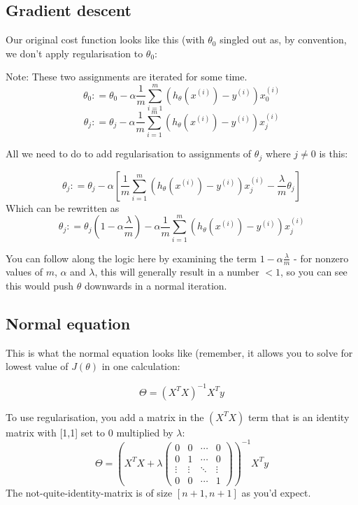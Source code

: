 \subsection{Gradient descent}

Our original cost function looks like this (with $\theta_0$ singled out as, by convention, we don't apply regularisation to $\theta_0$:

Note: These two assignments are iterated for some time.
\[
\theta_0 \mathrel{\mathop:}=
\theta_0 - \alpha \frac{1}{m}
\sum_{i=1}^{m}
(h_\theta(x^{(i)}) - y^{(i)})x_0^{(i)}
\]
\[
\theta_j \mathrel{\mathop:}=
\theta_j - \alpha \frac{1}{m}
\sum_{i=1}^{m}
(h_\theta(x^{(i)}) - y^{(i)})x_j^{(i)}
\]

All we need to do to add regularisation to assignments of $\theta_j$ where $j \neq 0$ is this:

\[
\theta_j \mathrel{\mathop:}=
\theta_j - \alpha [\frac{1}{m}
\sum_{i=1}^{m}
(h_\theta(x^{(i)}) - y^{(i)})x_j^{(i)} - \frac{\lambda}{m}\theta_j]
\]
Which can be rewritten as
\[
\theta_j \mathrel{\mathop:}=
\theta_j(1 - \alpha\frac{\lambda}{m})
 - \alpha \frac{1}{m}
\sum_{i=1}^{m}
(h_\theta(x^{(i)}) - y^{(i)})x_j^{(i)}
\]

You can follow along the logic here by examining the term $1 - \alpha\frac{\lambda}{m}$ - for nonzero values of $m$, $\alpha$ and $\lambda$, this will generally result in a number $< 1$, so you can see this would push $\theta$ downwards in a normal iteration.

\subsection{Normal equation}

This is what the normal equation looks like (remember, it allows you to solve for lowest value of  $J(\theta)$ in one calculation:

\[
\Theta = (X^TX)^{-1}X^Ty
\]

To use regularisation, you add a matrix in the $(X^TX)$ term that is an identity matrix with [1,1] set to 0 multiplied by $\lambda$:
\[
\Theta = (X^TX + \lambda
\begin{pmatrix}
0 & 0 & \cdots & 0 \\
0 & 1 & \cdots & 0 \\ 
\vdots & \vdots & \ddots & \vdots \\
0 & 0 & \cdots & 1
\end{pmatrix}
 )^{-1}X^Ty
\]
The not-quite-identity-matrix is of size $[n + 1, n + 1]$ as you'd expect.

